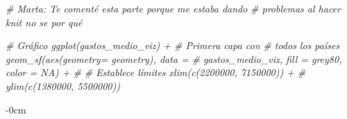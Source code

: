 \documentclass[data,article,submit,moreauthors,pdftex]{Definitions/mdpi}
\newenvironment{Shaded}{\begin{snugshade}}{\end{snugshade}}
\newcommand{\CommentTok}[1]{\textcolor[rgb]{0.56,0.35,0.01}{\textit{#1}}}
\begin{document}
\begin{Shaded}
\begin{Highlighting}[]
\CommentTok{\# Marta: Te comenté esta parte porque me estaba dando}
\CommentTok{\# problemas al hacer knit no se por qué}

\CommentTok{\# Gráfico ggplot(gastos\_medio\_viz) + \# Primera capa con}
\CommentTok{\# todos los países geom\_sf(aes(geometry= geometry), data =}
\CommentTok{\# gastos\_medio\_viz, fill = \textquotesingle{}grey80\textquotesingle{}, color = NA) + \#}
\CommentTok{\# Establece límites xlim(c(2200000, 7150000)) +}
\CommentTok{\# ylim(c(1380000, 5500000))}
\end{Highlighting}
\end{Shaded}



\vspace{6pt}














\begin{adjustwidth}{-\extralength}{0cm}





%

\PublishersNote{}
\end{adjustwidth}
\end{document}
